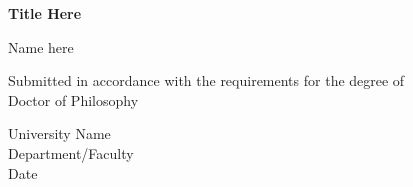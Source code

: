 \begin{titlepage}
    \begin{center}
        \vspace*{1cm}
        
        \Large{\textbf{Title Here}}
        
        
        \vspace{2cm}
        \normalsize
        Name here
        \vfill
        
       Submitted in accordance with the requirements for the degree of \\
       Doctor of Philosophy
        
        \vspace{0.8cm}
        
        University Name\\
        Department/Faculty\\
     \hfill\break
        Date
        
    \end{center}
\end{titlepage}
